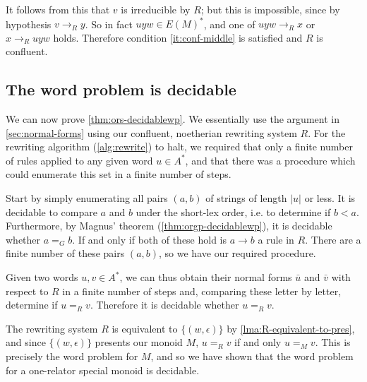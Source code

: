 \documentclass[noindex,noinsetproof,12pt]{lmaths}
\begin{document}
It follows from this that $v$ is irreducible by $R$; but this is impossible, since by hypothesis $v \to_R y$. So in fact $uyw \in E(M)^*$, and one of $uyw \to_R x$ or $x \to_R uyw$ holds. Therefore condition \ref{it:conf-middle} is satisfied and $R$ is confluent.


\subsection{The word problem is decidable}

We can now prove \cref{thm:ors-decidablewp}. We essentially use the argument in \cref{sec:normal-forms} using our confluent, noetherian rewriting system $R$. For the rewriting algorithm (\cref{alg:rewrite}) to halt, we required that only a finite number of rules applied to any given word $u \in A^*$, and that there was a procedure which could enumerate this set in a finite number of steps.

Start by simply enumerating all pairs $(a, b)$ of strings of length $|u|$ or less. It is decidable to compare $a$ and $b$ under the short-lex order, i.e. to determine if $b < a$. Furthermore, by Magnus' theorem (\cref{thm:orgp-decidablewp}), it is decidable whether $a =_G b$. If and only if both of these hold is $a \to b$ a rule in $R$. There are a finite number of these pairs $(a, b)$, so we have our required procedure.

Given two words $u, v \in A^*$, we can thus obtain their normal forms $\bar u$ and $\bar v$ with respect to $R$ in a finite number of steps and, comparing these letter by letter, determine if $u =_R v$. Therefore it is decidable whether $u =_R v$.

The rewriting system $R$ is equivalent to $\{(w, \epsilon)\}$ by \cref{lma:R-equivalent-to-pres}, and since $\{(w, \epsilon)\}$ presents our monoid $M$, $u =_R v$ if and only $u =_M v$. This is precisely the word problem for $M$, and so we have shown that the word problem for a one-relator special monoid is decidable.


\printbibliography

\printindex
\end{document}
